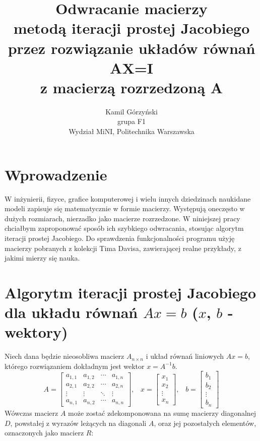 \documentclass[a4paper,margin=1.54cm]{article}
\title{Odwracanie macierzy\\metodą iteracji prostej Jacobiego\\przez rozwiązanie układów równań AX=I\\z macierzą rozrzedzoną A}
\author{\Large{Kamil Górzyński}\\grupa F1\\Wydział MiNI, Politechnika Warszawska}
\begin{document}
\begin{titlepage}
\maketitle
\end{titlepage}

\section{Wprowadzenie}
W inżynierii, fizyce, grafice komputerowej i wielu innych dziedzinach nauki\linebreak dane modeli zapisuje się matematycznie w formie macierzy. Występują one\linebreak często w dużych rozmiarach, nierzadko jako macierze rozrzedzone. W niniejszej pracy chciałbym zaproponować sposób ich szybkiego odwracania, stosując algorytm iteracji prostej Jacobiego. Do sprawdzenia funkcjonalności programu użyję macierzy pobranych z kolekcji Tima Davisa, zawierającej realne przykłady, z jakimi mierzy się nauka\cite{matrixcollection}.

\section{Algorytm iteracji prostej Jacobiego\\dla układu równań $Ax = b$ ($x$, $b$ - wektory) }

Niech dana będzie nieosobliwa macierz $A_{n\times n}$ i układ równań liniowych 
$ Ax = b $, \\
którego rozwiązaniem dokładnym jest wektor $x = A^{-1}b$.
\[
A = 
 \begin{bmatrix}
  a_{1,1} & a_{1,2} & \cdots & a_{1,n} \\
  a_{2,1} & a_{2,2} & \cdots & a_{2,n} \\
  \vdots  & \vdots  & \ddots & \vdots  \\
  a_{n,1} & a_{n,2} & \cdots & a_{n,n} 
 \end{bmatrix}
\textrm{,} \quad 
x = 
 \begin{bmatrix}
  x_{1}\\
  x_{2}\\
  \vdots\\
  x_{n}
 \end{bmatrix}
 \textrm{,} \quad 
b = 
 \begin{bmatrix}
  b_{1}\\
  b_{2}\\
  \vdots\\
  b_{n}
 \end{bmatrix}
\]
Wówczas macierz $A$ może zostać zdekomponowana na sumę macierzy diagonalnej $D$, powstałej z wyrazów leżących na diagonali $A$, oraz jej pozostałych elementów, oznaczonych jako macierz $R$: \cite{krupka2009wstep}\cite{stoerwstep} 
\end{document}
